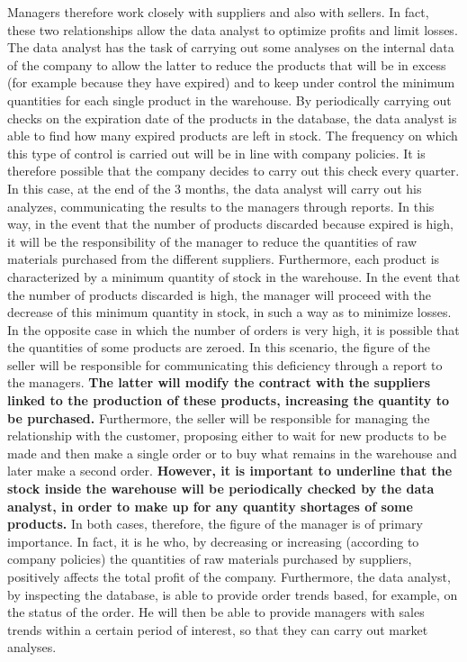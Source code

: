 Managers therefore work closely with suppliers and also with sellers. In fact, these two relationships allow the data analyst to optimize profits and limit losses. The data analyst has the task of carrying out some analyses on the internal data of the company to allow the latter to reduce the products that will be in excess (for example because they have expired) and to keep under control the minimum quantities for each single product in the warehouse. By periodically carrying out checks on the expiration date of the products in the database, the data analyst is able to find how many expired products are left in stock. The frequency on which this type of control is carried out will be in line with company policies. It is therefore possible that the company decides to carry out this check every quarter. In this case, at the end of the 3 months, the data analyst will carry out his analyzes, communicating the results to the managers through reports. In this way, in the event that the number of products discarded because expired is high, it will be the responsibility of the manager to reduce the quantities of raw materials purchased from the different suppliers. Furthermore, each product is characterized by a minimum quantity of stock in the warehouse. In the event that the number of products discarded is high, the manager will proceed with the decrease of this minimum quantity in stock, in such a way as to minimize losses. In the opposite case in which the number of orders is very high, it is possible that the quantities of some products are zeroed. In this scenario, the figure of the seller will be responsible for communicating this deficiency through a report to the managers. \textbf{The latter will modify the contract with the suppliers linked to the production of these products, increasing the quantity to be purchased.} Furthermore, the seller will be responsible for managing the relationship with the customer, proposing either to wait for new products to be made and then make a single order or to buy what remains in the warehouse and later make a second order. \textbf{However, it is important to underline that the stock inside the warehouse will be periodically checked by the data analyst, in order to make up for any quantity shortages of some products.} In both cases, therefore, the figure of the manager is of primary importance. In fact, it is he who, by decreasing or increasing (according to company policies) the quantities of raw materials purchased by suppliers, positively affects the total profit of the company. Furthermore, the data analyst, by inspecting the database, is able to provide order trends based, for example, on the status of the order. He will then be able to provide managers with sales trends within a certain period of interest, so that they can carry out market analyses.

